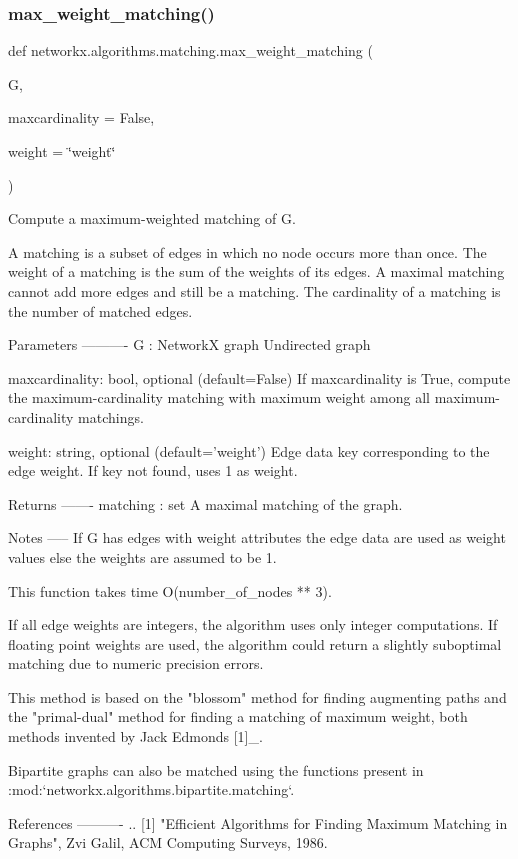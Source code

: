 \subsubsection{\texorpdfstring{max\+\_\+weight\+\_\+matching()}{max\_weight\_matching()}}
{\footnotesize\ttfamily def networkx.\+algorithms.\+matching.\+max\+\_\+weight\+\_\+matching (\begin{DoxyParamCaption}\item[{}]{G,  }\item[{}]{maxcardinality = {\ttfamily False},  }\item[{}]{weight = {\ttfamily \char`\"{}weight\char`\"{}} }\end{DoxyParamCaption})}

\begin{DoxyVerb}Compute a maximum-weighted matching of G.

A matching is a subset of edges in which no node occurs more than once.
The weight of a matching is the sum of the weights of its edges.
A maximal matching cannot add more edges and still be a matching.
The cardinality of a matching is the number of matched edges.

Parameters
----------
G : NetworkX graph
  Undirected graph

maxcardinality: bool, optional (default=False)
   If maxcardinality is True, compute the maximum-cardinality matching
   with maximum weight among all maximum-cardinality matchings.

weight: string, optional (default='weight')
   Edge data key corresponding to the edge weight.
   If key not found, uses 1 as weight.


Returns
-------
matching : set
    A maximal matching of the graph.

Notes
-----
If G has edges with weight attributes the edge data are used as
weight values else the weights are assumed to be 1.

This function takes time O(number_of_nodes ** 3).

If all edge weights are integers, the algorithm uses only integer
computations.  If floating point weights are used, the algorithm
could return a slightly suboptimal matching due to numeric
precision errors.

This method is based on the "blossom" method for finding augmenting
paths and the "primal-dual" method for finding a matching of maximum
weight, both methods invented by Jack Edmonds [1]_.

Bipartite graphs can also be matched using the functions present in
:mod:`networkx.algorithms.bipartite.matching`.

References
----------
.. [1] "Efficient Algorithms for Finding Maximum Matching in Graphs",
   Zvi Galil, ACM Computing Surveys, 1986.
\end{DoxyVerb}
 \mbox{\label{namespacenetworkx_1_1algorithms_1_1matching_aeaccb9ee6eef7c164ae2f45197694639}} 
